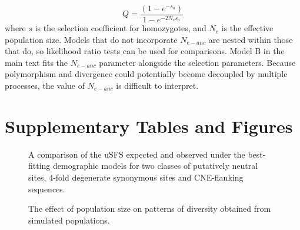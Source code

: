 \begin{equation}
Q = \frac{(1 - e^{-s_a})}{1-e^{-2N_es_a}}
\end{equation}
where $s$ is the selection coefficient for homozygotes, and $N_e$ is the effective population size. Models that do not incorporate $N_{e-anc}$ are nested within those that do, so likelihood ratio tests can be used for comparisons. Model B in the main text fits the $N_{e-anc}$ parameter alongside the selection parameters. Because polymorphism and divergence could potentially become decoupled by multiple processes, the value of $N_{e-anc}$ is difficult to interpret. 

\section{Supplementary Tables and Figures}
















 \begin{figure}[h!]
   \centering      
   \noindent{}
 \caption[A comparison of the uSFS expected and observed under demographic models fitted to two classes of sites]{A comparison of the uSFS expected and observed under the best-fitting demographic models for two classes of putatively neutral sites, 4-fold degenerate synonymous sites and CNE-flanking sequences.}
 \label{fig:C3S1}
\end{figure}



 \begin{figure}[h!]
   \centering      
   \noindent{}
 \caption[The effect of population size on patterns of diversity obtained from simulated populations]{The effect of population size on patterns of diversity obtained from simulated populations. }
 \label{fig:C3S2}
\end{figure}



